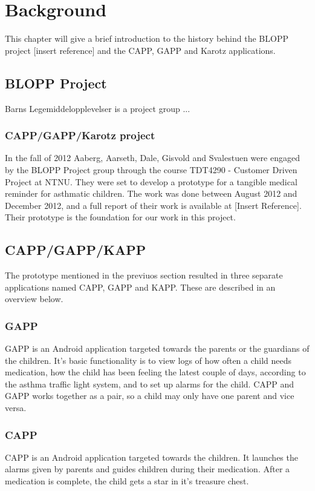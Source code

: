 \chapter{Background}
\label{chp:background}


This chapter will give a brief introduction to the history behind the BLOPP project [insert reference] and the CAPP, GAPP and Karotz applications.


\section{BLOPP Project}
\label{sec:bloppproject}
Barns Legemiddelopplevelser is a project group ...

\subsection{CAPP/GAPP/Karotz project}
In the fall of 2012 Aaberg, Aarseth, Dale, Gisvold and Svalestuen were engaged by the BLOPP Project group through the course TDT4290 - Customer Driven Project \cite{customerdrivenntnu} at NTNU. They were set to develop a prototype for a tangible medical reminder for asthmatic children. The work was done between August 2012 and December 2012, and a full report of their work is available at [Insert Reference]. 
Their prototype is the foundation for our work in this project.


\section{CAPP/GAPP/KAPP}
\label{sec:cappgappkapp}
The prototype mentioned in the previuos section resulted in three separate applications named CAPP, GAPP and KAPP. These are described in an overview below.  

\subsection{GAPP}
GAPP is an Android application targeted towards the parents or the guardians of the children. 
It's basic functionality is to view logs of how often a child needs medication, how the child has been feeling the latest couple of days, according to the asthma traffic light system, and to set up alarms for the child. 
CAPP and GAPP works together as a pair, so a child may only have one parent and vice versa. %


\subsection{CAPP}
CAPP is an Android application targeted towards the children. It launches the alarms given by parents and guides children during their medication. After a medication is complete, the child gets a star in it's treasure chest.    

